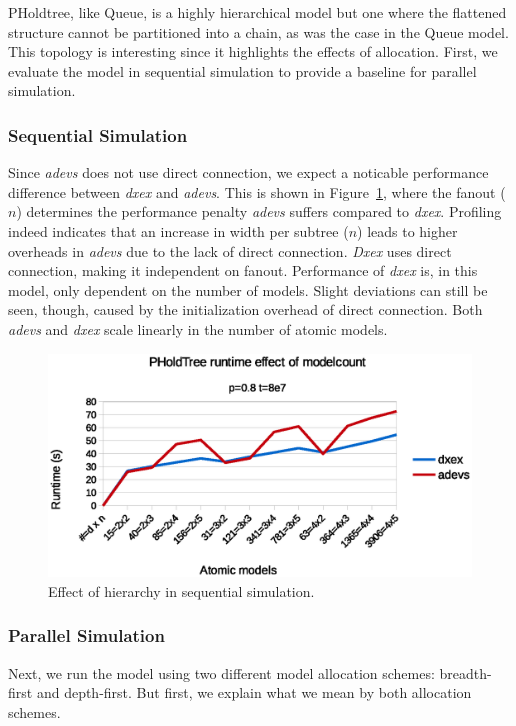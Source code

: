 PHoldtree, like Queue, is a highly hierarchical model but one where the flattened structure cannot be partitioned into a chain, as was the case in the Queue model.
This topology is interesting since it highlights the effects of allocation.
First, we evaluate the model in sequential simulation to provide a baseline for parallel simulation.

\subsubsection{Sequential Simulation}
Since \textit{adevs} does not use direct connection, we expect a noticable performance difference between \textit{dxex} and \textit{adevs}.
This is shown in Figure~\ref{fig:PHOLDtree_seq_dn_benchmark}, where the fanout ($n$) determines the performance penalty \textit{adevs} suffers compared to \textit{dxex}.
Profiling indeed indicates that an increase in width per subtree ($n$) leads to higher overheads in \textit{adevs} due to the lack of direct connection.
\textit{Dxex} uses direct connection, making it independent on fanout.
Performance of \textit{dxex} is, in this model, only dependent on the number of models.
Slight deviations can still be seen, though, caused by the initialization overhead of direct connection.
Both \textit{adevs} and \textit{dxex} scale linearly in the number of atomic models.

\begin{figure}
    \center
    \includegraphics[width=\columnwidth]{fig/pholdtree_sequential_dn.eps}
    \caption{Effect of hierarchy in sequential simulation.}
    \label{fig:PHOLDtree_seq_dn_benchmark}
\end{figure}

\subsubsection{Parallel Simulation}
Next, we run the model using two different model allocation schemes: breadth-first and depth-first.
But first, we explain what we mean by both allocation schemes.

